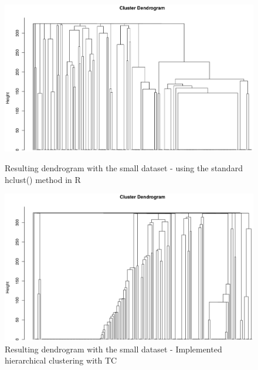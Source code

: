 \documentclass[a4paper,10pt]{article}
\theoremstyle{plain}
\theoremstyle{definition}
\begin{document}
\begin{figure}[H]
	\centering
	\begin{minipage}{0.75\textwidth}
		\includegraphics[width=1\textwidth]{./pictures/dendrogramHclustStandard.png}
		\caption{Resulting dendrogram with the small dataset - using the standard hclust() method in R}
		\label{fig:dendrogramHclustStandard}
	\end{minipage}
	\begin{minipage}{0.75\textwidth}
		\includegraphics[width=1\textwidth]{./pictures/dendrogramHcImplemented.png}
		\caption{Resulting dendrogram with the small dataset - Implemented hierarchical clustering with TC}
		\label{fig:dendrogramHcImplemented}
	\end{minipage}
\end{figure}
\end{document}
